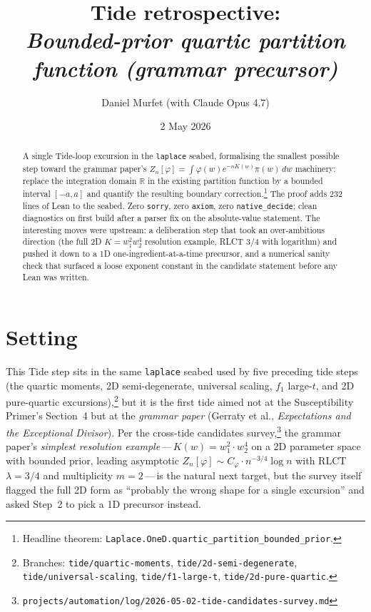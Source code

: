 \documentclass[11pt]{article}
\title{Tide retrospective:\\\emph{Bounded-prior quartic partition function (grammar precursor)}}
\author{Daniel Murfet (with Claude Opus 4.7)}
\date{2 May 2026}
\begin{document}
\maketitle

\begin{abstract}
A single Tide-loop excursion in the \texttt{laplace} seabed, formalising
the smallest possible step toward the grammar paper's
$Z_n[\varphi] = \int \varphi(w) e^{-n K(w)} \pi(w)\,dw$ machinery: replace
the integration domain $\mathbb{R}$ in the existing partition function
by a bounded interval $[-a,a]$ and quantify the resulting boundary
correction.\footnote{Headline theorem:
\texttt{Laplace.OneD.quartic\_partition\_bounded\_prior}.} The proof
adds 232 lines of Lean to the seabed. Zero \texttt{sorry}, zero
\texttt{axiom}, zero \texttt{native\_decide}; clean diagnostics on first
build after a parser fix on the absolute-value statement. The interesting
moves were upstream: a deliberation step that took an over-ambitious
direction (the full 2D $K = w_1^2 w_2^4$ resolution example, RLCT $3/4$
with logarithm) and pushed it down to a 1D one-ingredient-at-a-time
precursor, and a numerical sanity check that surfaced a loose exponent
constant in the candidate statement before any Lean was written.
\end{abstract}

\section{Setting}

This Tide step sits in the same \texttt{laplace} seabed used by five
preceding tide steps (the quartic moments, 2D semi-degenerate, universal
scaling, $f_1$ large-$t$, and 2D pure-quartic
excursions),\footnote{Branches: \texttt{tide/quartic-moments},
\texttt{tide/2d-semi-degenerate}, \texttt{tide/universal-scaling},
\texttt{tide/f1-large-t}, \texttt{tide/2d-pure-quartic}.} but it is the
first tide aimed not at the Susceptibility Primer's Section~4 but at the
\emph{grammar paper} (Gerraty et al., \emph{Expectations and the
Exceptional Divisor}). Per the cross-tide candidates
survey,\footnote{\texttt{projects/automation/log/2026-05-02-tide-candidates-survey.md}}
the grammar paper's \emph{simplest resolution example}\,---\,$K(w) =
w_1^2 \cdot w_2^4$ on a 2D parameter space with bounded prior, leading
asymptotic $Z_n[\varphi] \sim C_\varphi \cdot n^{-3/4} \log n$ with RLCT
$\lambda = 3/4$ and multiplicity $m = 2$\,---\,is the natural next
target, but the survey itself flagged the full 2D form as ``probably the
wrong shape for a single excursion'' and asked Step~2 to pick a 1D
precursor instead.
\end{document}
